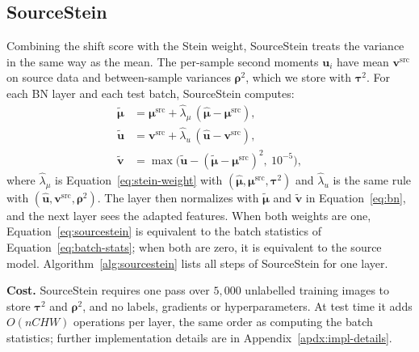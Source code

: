 \subsection{SourceStein} \label{sec:sourcestein}
Combining the shift score with the Stein weight, SourceStein treats the variance in the same way as the mean.
The per-sample second moments $\mathbf{u}_i$ have mean $\mathbf{v}^{\text{src}}$ on source data and between-sample variances $\boldsymbol{\rho}^2$, which we store with $\boldsymbol{\tau}^2$.
For each BN layer and each test batch, SourceStein computes:
\begin{equation}\label{eq:sourcestein}
\begin{aligned}
\tilde{\boldsymbol{\mu}} &= \boldsymbol{\mu}^{\text{src}} + \hat{\lambda}_{\mu}\,(\hat{\boldsymbol{\mu}} - \boldsymbol{\mu}^{\text{src}}),\\
\tilde{\mathbf{u}} &= \mathbf{v}^{\text{src}} + \hat{\lambda}_{u}\,(\hat{\mathbf{u}} - \mathbf{v}^{\text{src}}),\\
\tilde{\mathbf{v}} &= \max\!\big(\tilde{\mathbf{u}} - (\tilde{\boldsymbol{\mu}} - \boldsymbol{\mu}^{\text{src}})^{2},\ 10^{-5}\big),
\end{aligned}
\end{equation}
where $\hat{\lambda}_{\mu}$ is Equation~\ref{eq:stein-weight} with $(\hat{\boldsymbol{\mu}}, \boldsymbol{\mu}^{\text{src}}, \boldsymbol{\tau}^2)$ and $\hat{\lambda}_{u}$ is the same rule with $(\hat{\mathbf{u}}, \mathbf{v}^{\text{src}}, \boldsymbol{\rho}^2)$.
The layer then normalizes with $\tilde{\boldsymbol{\mu}}$ and $\tilde{\mathbf{v}}$ in Equation~\ref{eq:bn}, and the next layer sees the adapted features.
When both weights are one, Equation~\ref{eq:sourcestein} is equivalent to the batch statistics of Equation~\ref{eq:batch-stats}; when both are zero, it is equivalent to the source model.
Algorithm~\ref{alg:sourcestein} lists all steps of SourceStein for one layer.

\textbf{Cost.} SourceStein requires one pass over $5{,}000$ unlabelled training images to store $\boldsymbol{\tau}^2$ and $\boldsymbol{\rho}^2$, and no labels, gradients or hyperparameters.
At test time it adds $O(nCHW)$ operations per layer, the same order as computing the batch statistics; further implementation details are in Appendix~\ref{apdx:impl-details}.
